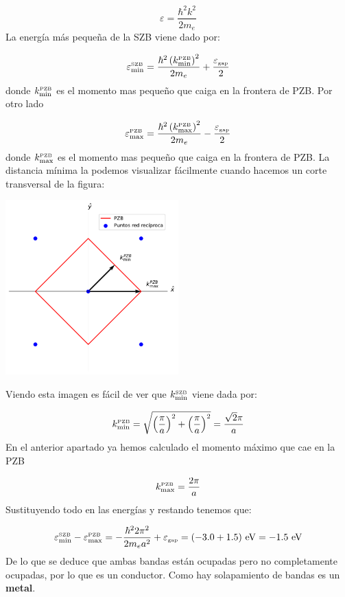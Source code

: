 \begin{solucion}
\begin{enumerate}
	\begin{equation*}
		\varepsilon = \frac{\hbar^2k^2}{2m_e}
	\end{equation*}
	La energía más pequeña de la SZB viene dado por:
	
	\begin{equation*}
		\varepsilon^{\text{{\tiny SZB}}}_{\min} = \frac{\hbar^2 \left( k^{\text{{\tiny PZB}}}_{\min} \right)^2}{2m_e} + \frac{\varepsilon_{\text{{\tiny gap}}}}{2}
	\end{equation*}
	donde $k^{\text{{\tiny PZB}}}_{\min}$ es el momento mas pequeño que caiga en la frontera de PZB. Por otro lado
	
	\begin{equation*}
		\varepsilon^{\text{{\tiny PZB}}}_{\max} = \frac{\hbar^2 \left( k^{\text{{\tiny PZB}}}_{\max} \right)^2}{2m_e} - \frac{\varepsilon_{\text{{\tiny gap}}}}{2}
	\end{equation*}
	donde $k^{\text{{\tiny PZB}}}_{\max}$ es el momento mas pequeño que caiga en la frontera de PZB. La distancia mínima la podemos visualizar fácilmente cuando hacemos un corte transversal de la figura:
	
	\begin{center}
		\includegraphics[width=0.5\textwidth]{Imagenes/2021_Enero_03_1.pdf}
	\end{center}
	Viendo esta imagen es fácil de ver que $k_{\min}^{\text{{\tiny SZB}}}$ viene dada por:
	
	\begin{equation*}
		k_{\min}^{\text{{\tiny PZB}}} =  \sqrt{\left( \frac{\pi}{a} \right)^2 +\left( \frac{\pi}{a} \right)^2 } = \frac{ \sqrt{2}\pi}{a}
 	\end{equation*}
	En el anterior apartado ya hemos calculado el momento máximo que cae en la PZB
	
	\begin{equation*}
		k^{\text{{\tiny PZB}}}_{\max} = \frac{2\pi}{a} 
	\end{equation*}
	Sustituyendo todo en las energías y restando tenemos que: 
	
	\begin{equation*}
		\varepsilon^{\SZB}_{\min} - \varepsilon^{\PZB}_{\max} = - \frac{\hbar^2 2\pi^2}{2m_e a^2}  +  \varepsilon_\gap = (-3.0 +1.5) \ \unit{eV} = -1.5 \ \unit{eV}
	\end{equation*}
	De lo que se deduce que ambas bandas están ocupadas pero no completamente ocupadas, por lo que es un conductor. Como hay solapamiento de bandas es un \textbf{metal}.	
	\end{enumerate}
\end{solucion}


